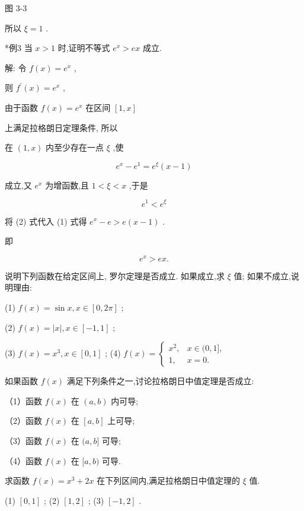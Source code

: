 \documentclass[lang=cn,newtx,10pt,scheme=chinese]{elegantbook}
\begin{document}
图 3-3

所以 \(\xi = 1\) .

*例3 当 \(x > 1\) 时,证明不等式 \({e}^{x} > {ex}\) 成立.

解: 令 \(f\left( x\right) = {e}^{x}\) ,

则 \({f}^{\prime }\left( x\right) = {e}^{x}\) ,

由于函数 \(f\left( x\right) = {e}^{x}\) 在区间 \(\left\lbrack {1,x}\right\rbrack\)

上满足拉格朗日定理条件, 所以

在 \(\left( {1,x}\right)\) 内至少存在一点 \(\xi\) ,使

\[
{e}^{x} - {e}^{1} = {e}^{\xi }\left( {x - 1}\right) \tag{1}
\]

成立,又 \({e}^{x}\) 为增函数,且 \(1 < \xi < x\) ,于是

\[
{e}^{1} < {e}^{\xi } \tag{2}
\]

将 (2) 式代入 (1) 式得 \({e}^{x} - e > e\left( {x - 1}\right)\) .

即

\[
{e}^{x} > {ex}\text{.}
\]

\begin{problemset}[练习]

\item 说明下列函数在给定区间上, 罗尔定理是否成立. 如果成立,求 \(\xi\) 值; 如果不成立,说明理由:

(1) \(f\left( x\right) = \sin x,x \in \left\lbrack {0,{2\pi }}\right\rbrack\) ;

(2) \(f\left( x\right) = \left| x\right| ,x \in \left\lbrack {-1,1}\right\rbrack\) ;

(3) \(f\left( x\right) = {x}^{3},x \in \left\lbrack {0,1}\right\rbrack\) ; (4) \(f\left( x\right) = \left\{ \begin{array}{ll} {x}^{2}, & x \in (0,1\rbrack , \\ 1, & x = 0. \end{array}\right.\)

\item 如果函数 \(f\left( x\right)\) 满足下列条件之一,讨论拉格朗日中值定理是否成立:

（1）函数 \(f\left( x\right)\) 在 \(\left( {a,b}\right)\) 内可导;

（2）函数 \(f\left( x\right)\) 在 \(\left\lbrack {a,b}\right\rbrack\) 上可导;

（3）函数 \(f\left( x\right)\) 在 \((a,b\rbrack\) 可导;

（4）函数 \(f\left( x\right)\) 在 \(\lbrack a,b)\) 可导.

\item 求函数 \(f\left( x\right) = {x}^{3} + {2x}\) 在下列区间内,满足拉格朗日中值定理的 \(\xi\) 值.

(1) \(\left\lbrack {0,1}\right\rbrack\) ; (2) \(\left\lbrack {1,2}\right\rbrack\) ; (3) \(\left\lbrack {-1,2}\right\rbrack\) .

\end{problemset}
\end{document}

